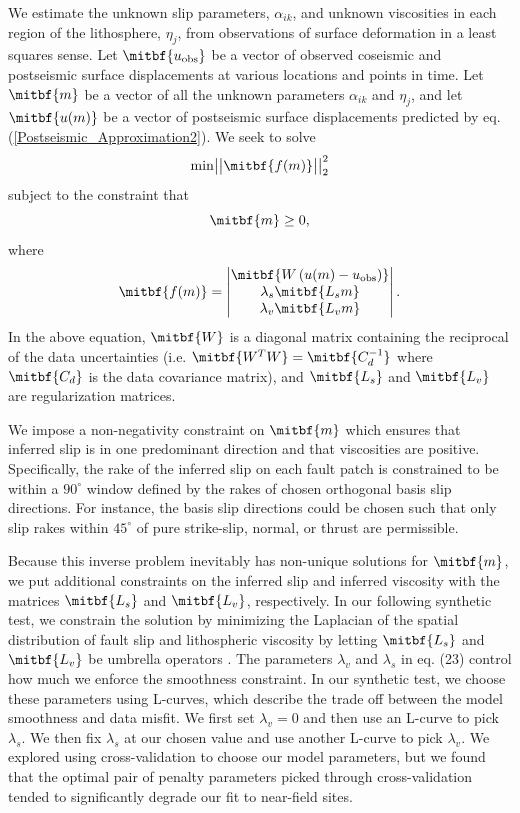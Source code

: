 \documentclass[extra,mreferee]{gji}
\begin{document}
We estimate the unknown slip parameters, $\alpha_{ik}$, and unknown
viscosities in each region of the lithosphere, $\eta_j$, from
observations of surface deformation in a least squares sense. Let
$\mitbf{u_{\mathrm{obs}}}$ be a vector of observed coseismic and
postseismic surface displacements at various locations and points in
time.  Let $\mitbf{m}$ be a vector of all the unknown parameters
$\alpha_{ik}$ and $\eta_j$, and let $\mitbf{u(m)}$ be a vector of
postseismic surface displacements predicted by eq.
(\ref{Postseismic_Approximation2}). We seek to solve
\begin{equation}\label{Inverse_Problem}
  \mathrm{min}
  \big|\big|\mitbf{f(m)}\big|\big|_2^2
\end{equation}
subject to the constraint that
\begin{equation}
  \mitbf{m}\geq0,
\end{equation}
where 
\begin{equation}\label{ResidualFunction}
  \mitbf{f(m)} = 
    \begin{vmatrix}
      \mitbf{W\left(u(m)-u_{\mathrm{obs}}\right)}\\
      \lambda_s\mitbf{L_sm}\\
      \lambda_v\mitbf{L_vm}\\
    \end{vmatrix} .
\end{equation}  
In the above equation, $\mitbf{W}$ is a diagonal matrix containing the
reciprocal of the data uncertainties
(i.e. $\mitbf{W^TW}=\mitbf{C_d^{-1}}$ where $\mitbf{C_d}$ is
the data covariance matrix), and $\mitbf{L_s}$ and $\mitbf{L_v}$ are
regularization matrices.

We impose a non-negativity constraint on $\mitbf{m}$ which ensures that
inferred slip is in one predominant direction and that viscosities are
positive.  Specifically, the rake of the inferred slip on each fault
patch is constrained to be within a $90^\circ$ window defined by the
rakes of chosen orthogonal basis slip directions. For instance, the
basis slip directions could be chosen such that only slip rakes within
$45^\circ$ of pure strike-slip, normal, or thrust are permissible.

Because this inverse problem inevitably has non-unique solutions for
$\mitbf{m}$, we put additional constraints on the inferred slip and
inferred viscosity with the matrices $\mitbf{L_s}$ and $\mitbf{L_v}$,
respectively.  In our following synthetic test, we constrain the
solution by minimizing the Laplacian of the spatial distribution of
fault slip and lithospheric viscosity by letting $\mitbf{L_s}$ and
$\mitbf{L_v}$ be umbrella operators \citep{D1999}.  The parameters
$\lambda_v$ and $\lambda_s$ in eq. (23) control how much we enforce
the smoothness constraint.  In our synthetic test, we choose these
parameters using L-curves, which describe the trade off between the
model smoothness and data misfit.  We first set $\lambda_v=0$ and then
use an L-curve to pick $\lambda_s$.  We then fix $\lambda_s$ at our
chosen value and use another L-curve to pick $\lambda_v$.  We explored
using cross-validation to choose our model parameters, but we found
that the optimal pair of penalty parameters picked through
cross-validation tended to significantly degrade our fit to near-field
sites.
\end{document}
